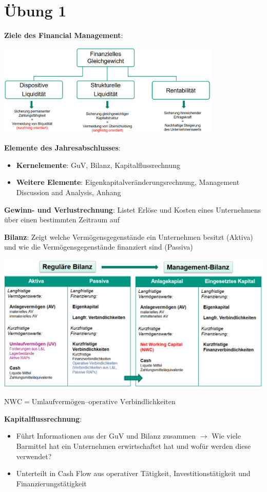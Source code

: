 \section{Übung 1}

\textbf{Ziele des Financial Management}:
\begin{center}
	\includegraphics[width=0.8\textwidth]{images/e1.png}
\end{center}

\textbf{Elemente des Jahresabschlusses}:
\begin{itemize}
	\item \textbf{Kernelemente}: GuV, Bilanz, Kapitalflussrechnung
	\item \textbf{Weitere Elemente}: Eigenkapitalveränderungsrechnung, Management Discussion and Analysis, Anhang
\end{itemize}

\textbf{Gewinn- und Verlustrechnung}: Listet Erlöse und Kosten eines Unternehmens über einen bestimmten Zeitraum auf

\textbf{Bilanz}: Zeigt welche Vermögensgegenstände ein Unternehmen besitzt (Aktiva) und wie die Vermögensgegenstände finanziert sind (Passiva)
\begin{center}
	\includegraphics[width=\textwidth]{images/e2.png}
\end{center}
$\text{NWC} = \text{Umlaufvermögen} – \text{operative Verbindlichkeiten}$
\pagebreak

\textbf{Kapitalflussrechnung}: 
\begin{itemize}
	\item Führt Informationen aus der GuV und Bilanz zusammen $\rightarrow$ Wie viele Barmittel hat ein Unternehmen erwirtschaftet hat und wofür werden diese verwendet?
	\item Unterteilt in Cash Flow aus operativer Tätigkeit, Investitionstätigkeit und Finanzierungstätigkeit
\end{itemize}

